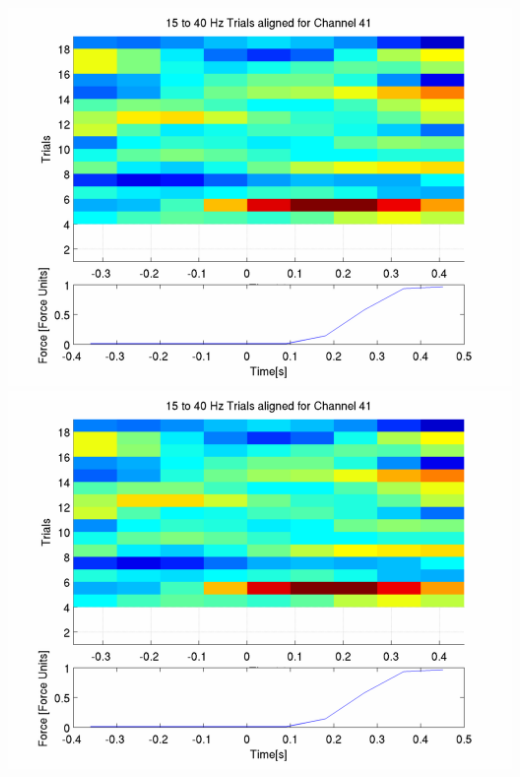 \documentclass[12pt]{article}
\begin{document}
\includegraphics[scale=0.2]{noCAR/log_plot_4_aligned_trials.png}
\includegraphics[scale=0.2]{WithCAR/log_plot_4_aligned_trials.png}
\end{document}
